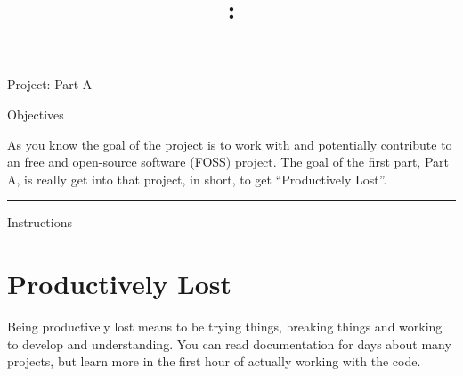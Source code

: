 \documentclass[letterpaper]{article}
\title{\course{}: \activity{}}
\date{}
\newcommand{\activity}{Project: Part A}
\newcommand{\horizrule}{\noindent\rule{\linewidth}{0.15mm}}
\begin{document}
\reversemarginpar

\begin{center}
  \Large{\activity{}}
\end{center}

\begin{center}
  \large{Objectives}
\end{center}

As you know the goal of the project is to work with and potentially contribute
to an free and open-source software (FOSS) project.  The goal of the first
part, Part A, is really get
into that project, in short, to get ``Productively Lost''.

\horizrule

\begin{center}
  \large{Instructions}
\end{center}


\section*{Productively Lost}

Being productively lost means to be trying things, breaking things and working
to develop and understanding.  You can read documentation for days about many
projects, but learn more in the first hour of actually working with the code.
\end{document}
